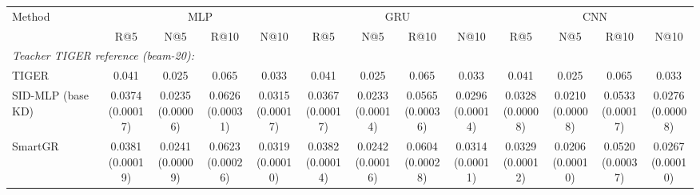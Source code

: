 \begin{table}[t]
\centering
\fontsize{6.6}{7.8}\selectfont
\setlength{\tabcolsep}{1.1mm}
\renewcommand{\arraystretch}{1.05}
\begin{tabular}{lcccccccccccc}
\toprule
Method & \multicolumn{4}{c}{MLP} & \multicolumn{4}{c}{GRU} & \multicolumn{4}{c}{CNN} \\
 & R@5 & N@5 & R@10 & N@10 & R@5 & N@5 & R@10 & N@10 & R@5 & N@5 & R@10 & N@10 \\
\cmidrule(lr){2-5}\cmidrule(lr){6-9}\cmidrule(lr){10-13}
\midrule
\multicolumn{13}{l}{\emph{Teacher TIGER reference (beam-20):}} \\
TIGER & 0.041 & 0.025 & 0.065 & 0.033 & 0.041 & 0.025 & 0.065 & 0.033 & 0.041 & 0.025 & 0.065 & 0.033 \\
\midrule
SID-MLP (base KD) & \shortstack[c]{0.0374\\[-1pt]{\tiny(0.00017)}} & \shortstack[c]{0.0235\\[-1pt]{\tiny(0.00006)}} & \shortstack[c]{0.0626\\[-1pt]{\tiny(0.00031)}} & \shortstack[c]{0.0315\\[-1pt]{\tiny(0.00017)}} & \shortstack[c]{0.0367\\[-1pt]{\tiny(0.00017)}} & \shortstack[c]{0.0233\\[-1pt]{\tiny(0.00014)}} & \shortstack[c]{0.0565\\[-1pt]{\tiny(0.00036)}} & \shortstack[c]{0.0296\\[-1pt]{\tiny(0.00014)}} & \shortstack[c]{0.0328\\[-1pt]{\tiny(0.00008)}} & \shortstack[c]{0.0210\\[-1pt]{\tiny(0.00008)}} & \shortstack[c]{0.0533\\[-1pt]{\tiny(0.00017)}} & \shortstack[c]{0.0276\\[-1pt]{\tiny(0.00008)}} \\
SmartGR & \shortstack[c]{0.0381\\[-1pt]{\tiny(0.00019)}} & \shortstack[c]{0.0241\\[-1pt]{\tiny(0.00009)}} & \shortstack[c]{0.0623\\[-1pt]{\tiny(0.00026)}} & \shortstack[c]{0.0319\\[-1pt]{\tiny(0.00010)}} & \shortstack[c]{0.0382\\[-1pt]{\tiny(0.00014)}} & \shortstack[c]{0.0242\\[-1pt]{\tiny(0.00016)}} & \shortstack[c]{0.0604\\[-1pt]{\tiny(0.00028)}} & \shortstack[c]{0.0314\\[-1pt]{\tiny(0.00011)}} & \shortstack[c]{0.0329\\[-1pt]{\tiny(0.00012)}} & \shortstack[c]{0.0206\\[-1pt]{\tiny(0.00010)}} & \shortstack[c]{0.0520\\[-1pt]{\tiny(0.00037)}} & \shortstack[c]{0.0267\\[-1pt]{\tiny(0.00010)}} \\

\end{tabular}
\end{table}

